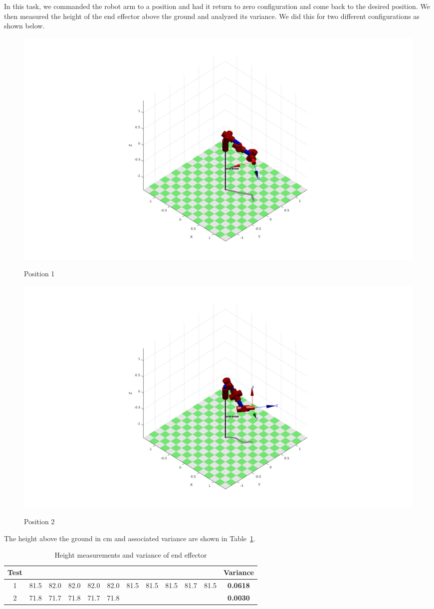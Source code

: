 \documentclass{../lab}
\begin{document}
\begin{task}
  In this task, we commanded the robot arm to a position and had it return to zero configuration and come back to the desired position. We then measured the height of the end effector above the ground and analyzed its variance. We did this for two different configurations as shown below. 

  \begin{figure}[H]
    \centering
    \includegraphics[scale=.3]{task2-1.png}
    \label{t2Pos1}
    \caption{Position 1}
  \end{figure}

  \begin{figure}[H]
    \centering
    \includegraphics[scale=.3]{task2-2.png}
    \label{t2Pos2}
    \caption{Position 2}
  \end{figure}

  The height above the ground in cm and associated variance are shown in Table~\ref{var}.
  \begin{table}
  \centering
  \setlength\tabcolsep{0.1cm}
  \begin{tabular}{|c|cccccccccc|c|}
    \hline
    Test & & & & & & & & & & & Variance\\
   \hline
   1 & 81.5 & 82.0 & 82.0 & 82.0 & 82.0 & 81.5& 81.5& 81.5& 81.7 & 81.5 & \bf{0.0618} \\
   2 & 71.8 & 71.7 & 71.8 & 71.7 & 71.8 & & & & & & \bf{0.0030} \\
   \hline
  \end{tabular}
  \label{var}
  \caption{Height measurements and variance of end effector}
  \end{table}


\end{task}
\end{document}
